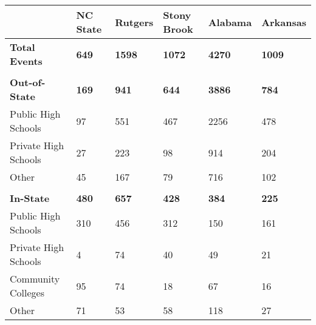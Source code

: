 \begin{longtabu}{X[1.6,l] X[1,c] X[1,c] X[1,c] X[1,c] X[1,c]}%
\textbf{}&\textbf{NC State}&\textbf{Rutgers}&\textbf{Stony Brook}&\textbf{Alabama}&\textbf{Arkansas}\\%
\hline%
\textbf{Total Events}&\textbf{649}&\textbf{1598}&\textbf{1072}&\textbf{4270}&\textbf{1009}\\%
&&&&&\\%
\textbf{Out{-}of{-}State}&\textbf{169}&\textbf{941}&\textbf{644}&\textbf{3886}&\textbf{784}\\%
\hspace{0.4cm}Public High Schools&97&551&467&2256&478\\%
\hspace{0.4cm}Private High Schools&27&223&98&914&204\\%
\hspace{0.4cm}Other&45&167&79&716&102\\%
&&&&&\\%
\textbf{In{-}State}&\textbf{480}&\textbf{657}&\textbf{428}&\textbf{384}&\textbf{225}\\%
\hspace{0.4cm}Public High Schools&310&456&312&150&161\\%
\hspace{0.4cm}Private High Schools&4&74&40&49&21\\%
\hspace{0.4cm}Community Colleges&95&74&18&67&16\\%
\hspace{0.4cm}Other&71&53&58&118&27\\%
\hline%
\end{longtabu}%
